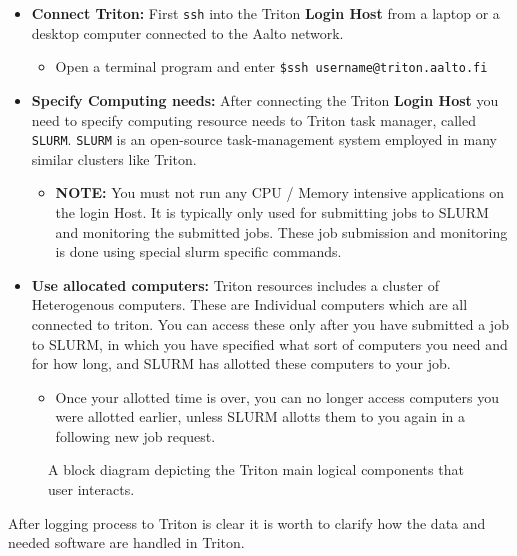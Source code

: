 \documentclass[a4paper,11pt]{article}
\begin{document}
\begin{itemize}
    \item \textbf{Connect Triton:} First  \texttt{ssh} into the Triton \textbf{Login Host} from a laptop or a desktop computer connected to the Aalto network.
    \begin{itemize}
    \item Open a terminal program and enter \texttt{\$ssh username@triton.aalto.fi} 
	\end{itemize}
    \item \textbf{Specify Computing needs:} After connecting the Triton \textbf{Login Host} you need to specify computing resource needs to Triton task manager, called \texttt{SLURM}. \texttt{SLURM} is an open-source task-management system employed in many similar clusters like Triton.
    \begin{itemize}
        \item     \textbf{NOTE:} You must not run any CPU / Memory intensive applications on the login Host. It is typically only used for submitting jobs to SLURM and monitoring the submitted jobs. These job submission and monitoring is done using special slurm specific commands.
    \end{itemize}
    \item \textbf{Use allocated computers:} Triton resources includes a cluster of Heterogenous computers. These are Individual computers which are all connected to triton. You can access these only after you have submitted a job to SLURM, in which you have specified what sort of computers you need and for how long, and SLURM has allotted these computers to your job. 
    \begin{itemize}
    	\item      Once your allotted time is over, you can no longer access computers you were allotted earlier, unless SLURM allotts them to you again in a following new job request.
    \end{itemize}

\end{itemize}

\begin{figure}[ht]
    \capstart
    \centering
    \caption{A block diagram depicting the Triton  main logical components that user interacts.}
    \label{fig:1}
\end{figure}

After logging process to Triton is clear it is worth to clarify how the data and needed software are handled in Triton.  
\end{document}
